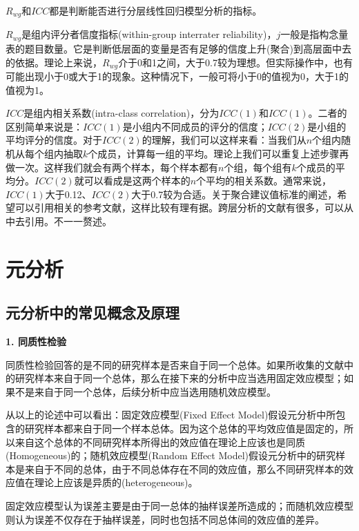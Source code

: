 \documentclass[
]{book}
\begin{document}
\(R_{wg}\)和\(ICC\)都是判断能否进行分层线性回归模型分析的指标。

\(R_{wg}\)是组内评分者信度指标(within-group interrater reliability)，\(j\)一般是指构念量表的题目数量。它是判断低层面的变量是否有足够的信度上升(聚合)到高层面中去的依据。理论上来说，\(R_{wg}\)介于0和1之间，大于0.7较为理想。但实际操作中，也有可能出现小于0或大于1的现象。这种情况下，一般可将小于0的值视为0，大于1的值视为1\autocite{law2014:StochProc}。

\(ICC\)是组内相关系数(intra-class correlation)，分为\(ICC(1)\)和\(ICC(1)\)。二者的区别简单来说是：\(ICC(1)\)是小组内不同成员的评分的信度；\(ICC(2)\)是小组的平均评分的信度。对于\(ICC(2)\)的理解，我们可以这样来看：当我们从\(n\)个组内随机从每个组内抽取\(k\)个成员，计算每一组的平均。理论上我们可以重复上述步骤再做一次。这样我们就会有两个样本，每个样本都有\(n\)个组，每个组有\(k\)个成员的平均分。\(ICC(2)\)就可以看成是这两个样本的\(n\)个平均的相关系数。通常来说，\(ICC(1)\)大于0.12、\(ICC(2)\)大于0.7较为合适。关于聚合建议值标准的阐述，希望可以引用相关的参考文献，这样比较有理有据。跨层分析的文献有很多，可以从中去引用。不一一赘述。

\hypertarget{meta}{%
\chapter{元分析}\label{meta}}

\hypertarget{meta-concept}{%
\section{元分析中的常见概念及原理}\label{meta-concept}}

\textbf{1. 同质性检验}

同质性检验回答的是不同的研究样本是否来自于同一个总体。如果所收集的文献中的研究样本来自于同一个总体，那么在接下来的分析中应当选用固定效应模型；如果不是来自于同一个总体，后续分析中应当选用随机效应模型。

从以上的论述中可以看出：固定效应模型(Fixed Effect Model)假设元分析中所包含的研究样本都来自于同一个样本总体。因为这个总体的平均效应值是固定的，所以来自这个总体的不同研究样本所得出的效应值在理论上应该也是同质(Homogeneous)的；随机效应模型(Random Effect Model)假设元分析中的研究样本是来自于不同的总体，由于不同总体存在不同的效应值，那么不同研究样本的效应值在理论上应该是异质的(heterogeneous)。

固定效应模型认为误差主要是由于同一总体的抽样误差所造成的；而随机效应模型则认为误差不仅存在于抽样误差，同时也包括不同总体间的效应值的差异。
\end{document}
